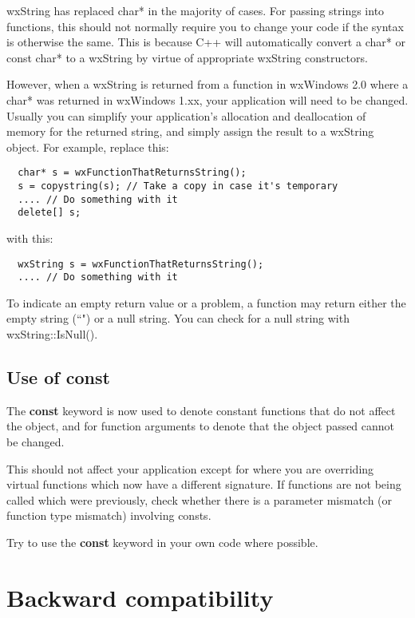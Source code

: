 wxString has replaced char* in the majority of cases. For passing strings into functions,
this should not normally require you to change your code if the syntax is otherwise the
same. This is because C++ will automatically convert a char* or const char* to a wxString by virtue
of appropriate wxString constructors.

However, when a wxString is returned from a function in wxWindows 2.0 where a char* was
returned in wxWindows 1.xx, your application will need to be changed. Usually you can
simplify your application's allocation and deallocation of memory for the returned string,
and simply assign the result to a wxString object. For example, replace this:

{\small\begin{verbatim}
  char* s = wxFunctionThatReturnsString();
  s = copystring(s); // Take a copy in case it's temporary
  .... // Do something with it
  delete[] s;
\end{verbatim}
}

with this:

{\small\begin{verbatim}
  wxString s = wxFunctionThatReturnsString();
  .... // Do something with it
\end{verbatim}
}

To indicate an empty return value or a problem, a function may return either the
empty string (``") or a null string. You can check for a null string with wxString::IsNull().

\section{Use of const}

The {\bf const} keyword is now used to denote constant functions that do not affect the
object, and for function arguments to denote that the object passed cannot be changed.

This should not affect your application except for where you are overriding virtual functions
which now have a different signature. If functions are not being called which were previously,
check whether there is a parameter mismatch (or function type mismatch) involving consts.

Try to use the {\bf const} keyword in your own code where possible.

\chapter{Backward compatibility}\label{compat}

